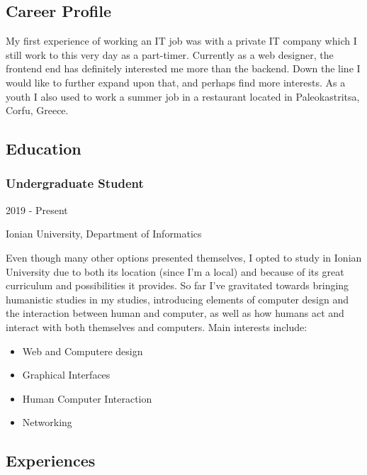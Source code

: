 \documentclass[english,]{article}
\providecommand{\tightlist}{%
  \setlength{\itemsep}{0pt}\setlength{\parskip}{0pt}}
\begin{document}
\hypertarget{career-profile}{%
\subsection{\texorpdfstring{{ \emph{} \emph{} } Career
Profile}{    Career Profile}}\label{career-profile}}

My first experience of working an IT job was with a private IT company
which I still work to this very day as a part-timer. Currently as a web
designer, the frontend end has definitely interested me more than the
backend. Down the line I would like to further expand upon that, and
perhaps find more interests. As a youth I also used to work a summer job
in a restaurant located in Paleokastritsa, Corfu, Greece.

\hypertarget{education}{%
\subsection{\texorpdfstring{{ \emph{} \emph{} }
Education}{    Education}}\label{education}}

\hypertarget{undergraduate-student}{%
\subsubsection{Undergraduate Student}\label{undergraduate-student}}

2019 - Present

Ionian University, Department of Informatics

Even though many other options presented themselves, I opted to study in
Ionian University due to both its location (since I'm a local) and
because of its great curriculum and possibilities it provides. So far
I've gravitated towards bringing humanistic studies in my studies,
introducing elements of computer design and the interaction between
human and computer, as well as how humans act and interact with both
themselves and computers. Main interests include:

\begin{itemize}
\tightlist
\item
  Web and Computere design
\item
  Graphical Interfaces
\item
  Human Computer Interaction
\item
  Networking
\end{itemize}

\hypertarget{experiences}{%
\subsection{\texorpdfstring{{ \emph{} \emph{} }
Experiences}{    Experiences}}\label{experiences}}
\end{document}
